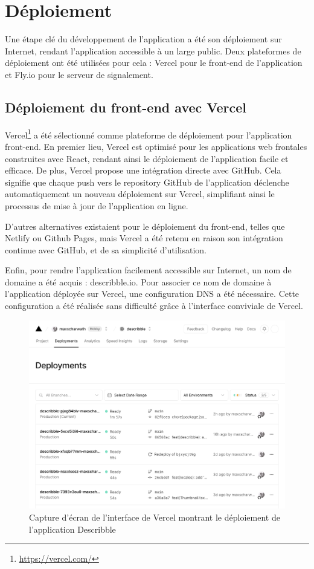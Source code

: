 \section{Déploiement}

Une étape clé du développement de l'application a été son déploiement sur Internet, rendant l'application accessible à un large public. Deux plateformes de déploiement ont été utilisées pour cela : Vercel pour le front-end de l'application et Fly.io pour le serveur de signalement.

\subsection{Déploiement du front-end avec Vercel}

Vercel\footnote{\url{https://vercel.com/}} a été sélectionné comme plateforme de déploiement pour l'application front-end. En premier lieu, Vercel est optimisé pour les applications web frontales construites avec React, rendant ainsi le déploiement de l'application facile et efficace. De plus, Vercel propose une intégration directe avec GitHub. Cela signifie que chaque push vers le repository GitHub de l'application déclenche automatiquement un nouveau déploiement sur Vercel, simplifiant ainsi le processus de mise à jour de l'application en ligne.

D'autres alternatives existaient pour le déploiement du front-end, telles que Netlify ou Github Pages, mais Vercel a été retenu en raison son intégration continue avec GitHub, et de sa simplicité d'utilisation.

Enfin, pour rendre l'application facilement accessible sur Internet, un nom de domaine a été acquis : describble.io. Pour associer ce nom de domaine à l'application déployée sur Vercel, une configuration DNS a été nécessaire. Cette configuration a été réalisée sans difficulté grâce à l'interface conviviale de Vercel.

\begin{figure}[H]
    \centering
    \includegraphics[width=1\textwidth]{assets/figures/vercel-deploy.png}
    \caption{Capture d'écran de l'interface de Vercel montrant le déploiement de l'application Describble}
\end{figure}

